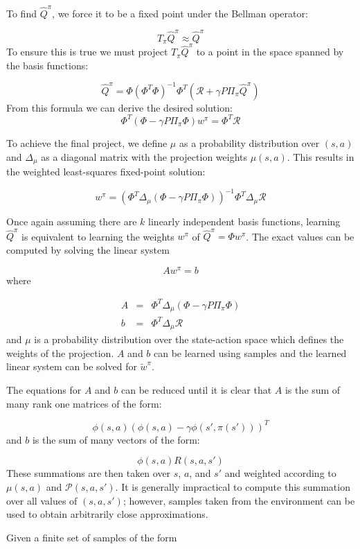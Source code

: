 To find $\hat{Q}^\pi$, we force it to be a fixed point under the Bellman operator:

\[
    T_\pi\hat{Q}^\pi \approx \hat{Q}^\pi
\]
To ensure this is true we must project $T_\pi\hat{Q}^\pi$ to a point in the space spanned by the basis functions:

\[
    \hat{Q}^\pi = \Phi(\Phi^T\Phi)^{-1}\Phi^T(\mathcal{R} + \gamma P\Pi_\pi\hat{Q}^\pi)
\]
From this formula we can derive the desired solution:
\[
    \Phi^T(\Phi - \gamma P\Pi_\pi\Phi)w^\pi = \Phi^T\mathcal{R}
\]

To achieve the final project, we define $\mu$ as a probability distribution over $(s,a)$ and $\Delta_\mu$ as a diagonal matrix with the projection weights $\mu(s,a)$. This results in the weighted least-squares fixed-point solution:

\[
    w^\pi = (\Phi^T\Delta_\mu(\Phi - \gamma P\Pi_\pi\Phi))^{-1}\Phi^T\Delta_\mu\mathcal{R}
\]

Once again assuming there are $k$ linearly independent basis functions, learning $\hat{Q}^\pi$ is equivalent to learning the weights $w^\pi$ of $\hat{Q}^\pi = \Phi w^\pi$. The exact values can be computed by solving the linear system

\[
    Aw^\pi = b
\]
where

\[
    \begin{array}{rcl}
        A &=& \Phi^T\Delta_\mu(\Phi - \gamma P\Pi_\pi\Phi) \\
        b &=& \Phi^T\Delta_\mu\mathcal{R}
    \end{array}
\]
and $\mu$ is a probability distribution over the state-action space which defines the weights of the projection. $A$ and $b$ can be learned using samples and the learned linear system can be solved for $\tilde{w}^\pi$. 

The equations for $A$ and $b$ can be reduced until it is clear that $A$ is the sum of many rank one matrices of the form:

\[
    \phi(s,a)(\phi(s,a) - \gamma\phi(s',\pi(s')))^T
\]
and $b$ is the sum of many vectors of the form:

\[
    \phi(s,a)R(s,a,s')
\]
These summations are then taken over $s$, $a$, and $s'$ and weighted according to $\mu(s,a)$ and $\mathcal{P}(s,a,s')$. It is generally impractical to compute this summation over all values of $(s,a,s')$; however, samples taken from the environment can be used to obtain arbitrarily close approximations.

Given a finite set of samples of the form

